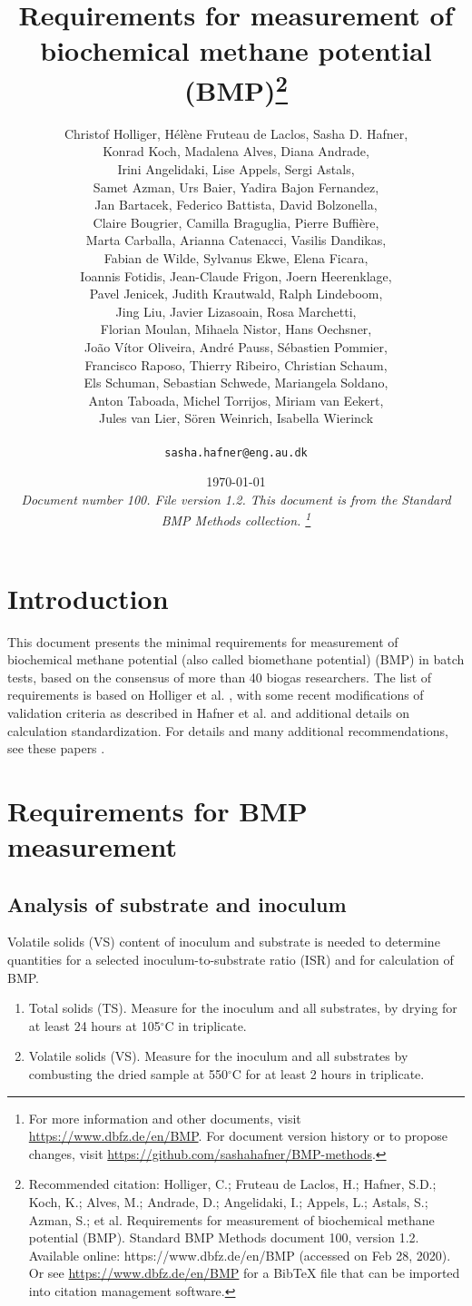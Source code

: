 \documentclass[]{article}
\title {Requirements for measurement of biochemical methane potential (BMP)\footnote{
  Recommended citation: 
Holliger, C.; Fruteau de Laclos, H.; Hafner, S.D.; Koch, K.; Alves, M.; Andrade, D.; Angelidaki, I.; Appels, L.; Astals, S.; Azman, S.; et al. Requirements for measurement of biochemical methane potential (BMP). Standard BMP Methods document 100, version 1.2. Available online: https://www.dbfz.de/en/BMP (accessed on Feb 28, 2020).
\newline
  Or see \url{https://www.dbfz.de/en/BMP} for a BibTeX file that can be imported into citation management software.
}}
\author{
Christof Holliger, 
H{\'e}l{\`e}ne Fruteau de Laclos,
Sasha D. Hafner,\\
Konrad Koch,
Madalena Alves, 
Diana Andrade,\\
Irini Angelidaki,
Lise Appels,
Sergi Astals, \\
Samet Azman,
Urs Baier,
Yadira Bajon Fernandez,\\
Jan Bartacek,
Federico Battista,
David Bolzonella,\\
Claire Bougrier,
Camilla Braguglia,
Pierre Buffi{\`e}re,\\
Marta Carballa,
Arianna Catenacci,
Vasilis Dandikas,\\
Fabian de Wilde,
Sylvanus Ekwe,
Elena Ficara,\\
Ioannis Fotidis,
Jean-Claude Frigon, 
Joern Heerenklage,\\
Pavel Jenicek,
Judith Krautwald,
Ralph Lindeboom,\\
Jing Liu,
Javier Lizasoain,
Rosa Marchetti,\\
Florian Moulan,
Mihaela Nistor,
Hans Oechsner,\\
Jo{\~a}o V{\'i}tor Oliveira,
Andr{\'e} Pauss,
S{\'e}bastien Pommier,\\
Francisco Raposo,
Thierry Ribeiro,
Christian Schaum,\\
Els Schuman,
Sebastian Schwede,
Mariangela Soldano,\\
Anton Taboada,
Michel Torrijos, 
Miriam van Eekert,\\
Jules van Lier,
S{\"o}ren Weinrich, 
Isabella Wierinck\\
\\
\texttt{sasha.hafner@eng.au.dk}
}
\date{\today \\
\bigskip
\textit{
  Document number 100.
  File version 1.2. 
  This document is from the Standard BMP Methods collection.
    \footnote{For more information and other documents, visit \url{https://www.dbfz.de/en/BMP}. 
    For document version history or to propose changes, visit \url{https://github.com/sashahafner/BMP-methods}.}
}
}
\begin{document}
\maketitle

\section{Introduction}
This document presents the minimal requirements for measurement of biochemical methane potential (also called biomethane potential) (BMP) in batch tests, based on the consensus of more than 40 biogas researchers.
The list of requirements is based on Holliger et al. \cite{iis2016}, with some recent modifications of validation criteria as described in Hafner et al. \cite{iis2020} and additional details on calculation standardization.
For details and many additional recommendations, see these papers \cite{iis2016,iis2020}.

\section{Requirements for BMP measurement}
\subsection{Analysis of substrate and inoculum}
\label{sec:analysis}
  Volatile solids (VS) content of inoculum and substrate is needed to determine quantities for a selected inoculum-to-substrate ratio (ISR) and for calculation of BMP.
  \begin{enumerate}
    \item Total solids (TS). Measure for the inoculum and all substrates, by drying for at least 24 hours at 105$^\circ$C in triplicate.
    \item Volatile solids (VS). Measure for the inoculum and all substrates by combusting the dried sample at 550$^\circ$C for at least 2 hours in triplicate.
  \end{enumerate}
\end{document}
